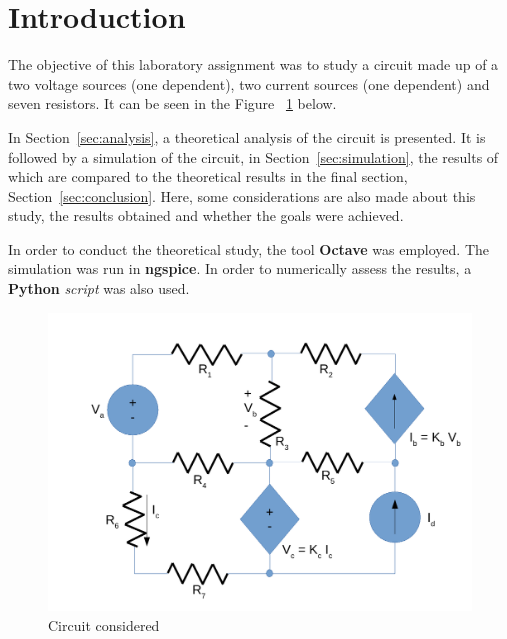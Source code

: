 \section{Introduction}
\label{sec:introduction}

The objective of this laboratory assignment was to study a circuit made up of a two voltage sources (one dependent), two current sources (one dependent) and seven resistors. It can be seen in the Figure ~\ref{circuit} below.

In Section~\ref{sec:analysis}, a theoretical analysis of the circuit is presented. It is followed by a simulation of the circuit, in Section~\ref{sec:simulation}, the results of which are compared to the theoretical results in the final section, Section~\ref{sec:conclusion}. Here, some  considerations are also made about this study, the results obtained and whether the goals were achieved.

In order to conduct the theoretical study, the tool {\bf Octave} was employed. The simulation was run in {\bf ngspice}. In order to numerically assess the results, a {\bf Python} {\it script} was also used.


\begin{figure}[H]
  \centering
  \includegraphics[width=0.6\linewidth]{simple.pdf}
  \caption{Circuit considered}
  \label{circuit}
\end{figure}

